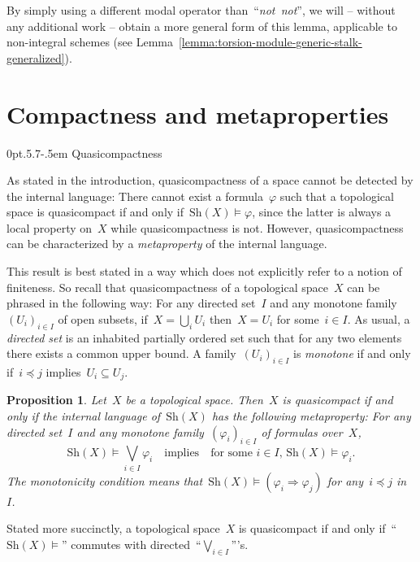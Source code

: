\documentclass[10pt,reqno,a4paper]{amsbook}
\makeatletter
\theoremstyle{definition}
\theoremstyle{plain}
\newtheorem{prop}[defn]{Proposition}
\theoremstyle{remark}
\newcommand{\Sh}{\mathrm{Sh}}
\newcommand{\?}{\,{:}\,}
\renewcommand{\_}{\mathpunct{.}\,}
\newcommand{\notnot}{\emph{not~not}\xspace}
\def\subsection{\@startsection{subsection}{2}%
  {0pt}{.5\linespacing\@plus.7\linespacing}{-.5em}%
  {\normalfont\bfseries}}
\makeatother
\begin{document}
By simply using a different modal operator than~``\notnot'', we will -- without
any additional work -- obtain a more general form of this lemma, applicable to
non-integral schemes (see Lemma~\ref{lemma:torsion-module-generic-stalk-generalized}).


\section{Compactness and metaproperties}
\label{sect:compactness}

\subsection{Quasicompactness}

As stated in the introduction, quasicompactness of a space cannot be detected
by the internal language: There cannot exist a formula~$\varphi$ such that a
topological space is quasicompact if and only if~$\Sh(X) \models \varphi$,
since the latter is always a local property on~$X$ while quasicompactness is not.
However, quasicompactness can be characterized by a \emph{metaproperty} of the
internal language.

This result is best stated in a way which does not explicitly refer to a notion
of finiteness. So recall that quasicompactness of a topological space~$X$ can
be phrased in the following way: For any directed set~$I$ and any monotone
family~$(U_i)_{i \in I}$ of open subsets, if~$X = \bigcup_i U_i$ then~$X = U_i$
for some~$i \in I$. As usual, a \emph{directed set} is an inhabited partially
ordered set such that for any two elements there exists a common upper bound.
A family~$(U_i)_{i \in I}$ is \emph{monotone} if and only if~$i \preceq j$
implies~$U_i \subseteq U_j$.

\begin{prop}\label{prop:quasicompact-meta}
Let~$X$ be a topological space. Then~$X$ is quasicompact if and
only if the internal language of~$\Sh(X)$ has the following metaproperty:
For any directed set~$I$ and any monotone family~$(\varphi_i)_{i \in I}$ of
formulas over~$X$,
\[ \Sh(X) \models \bigvee_{i \in I} \varphi_i
  \quad\text{implies}\quad
  \text{for some~$i \in I$, $\Sh(X) \models \varphi_i$}. \]
The monotonicity condition means that~$\Sh(X) \models (\varphi_i \Rightarrow
\varphi_j)$ for any~$i \preceq j$ in~$I$.
\end{prop}

Stated more succinctly, a topological space~$X$ is quasicompact if and only
if~``$\Sh(X) \models$'' commutes with directed~``$\bigvee_{i \in I}$'''s.
\end{document}
